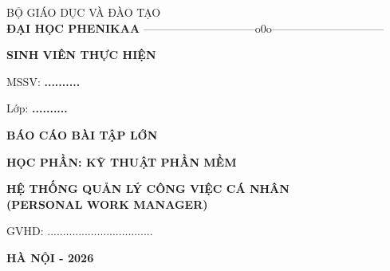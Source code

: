 \documentclass[12pt,a4paper]{article}
\theoremstyle{plain} %
\theoremstyle{plain} %
\theoremstyle{plain} %
\theoremstyle{nonumberplain}  %
\numberwithin{equation}{section}
\numberwithin{figure}{section}
\begin{document}
 \thisfancypage{\setlength{\fboxsep}{0.2cm}\setlength{\fboxrule}{1pt}\doublebox}{}
 \begin{titlepage}
\begin{center}
	\large
	BỘ GIÁO DỤC VÀ ĐÀO TẠO\\
	{\bf ĐẠI HỌC PHENIKAA}
	{——————————o0o——————————}  
\end{center}
\vspace{2cm}
\begin{center}
	\large {\bf SINH VIÊN THỰC HIỆN} 
\end{center}
\begin{center}
    MSSV: \textbf{..........}
\end{center}
\begin{center}
    Lớp: \textbf{..........}
\end{center}
\vspace{1 cm}
\begin{center}
    \bf\large {BÁO CÁO BÀI TẬP LỚN}
\end{center}
\begin{center}
    \bf {HỌC PHẦN: KỸ THUẬT PHẦN MỀM}
\end{center}
\vspace{1cm}
\begin{center}
	\bf\Large HỆ THỐNG QUẢN LÝ CÔNG VIỆC CÁ NHÂN\\ (PERSONAL WORK MANAGER)
\end{center}
\vspace{1cm}
\begin{center}
	GVHD: ..................................
\end{center}
\vspace{2.5cm}
\begin{center}
	\large {\bf HÀ NỘI - 2026}
\end{center}
 \end{titlepage}

\pagestyle{fancy}
\hypersetup{linkcolor=black}
\tableofcontents
\vspace{2cm}

\renewcommand{\listfigurename}{Danh mục hình ảnh}
\listoffigures
\hypersetup{linkcolor=blue}
\newpage







\newpage

\renewcommand{\refname}{Tài liệu tham khảo}


\end{document}
